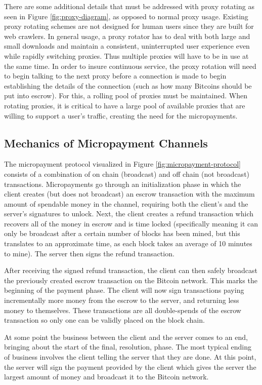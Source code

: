 There are some additional details that must be addressed with proxy rotating as seen in Figure \ref{fig:proxy-diagram}, as opposed to normal proxy usage. Existing proxy rotating schemes are not designed for human users since they are built for web crawlers. In general usage, a proxy rotator has to deal with both large and small downloads and maintain a consistent, uninterrupted user experience even while rapidly switching proxies. Thus multiple proxies will have to be in use at the same time. In order to insure continuous service, the proxy rotation will need to begin talking to the next proxy before a connection is made to begin establishing the details of the connection (such as how many Bitcoins should be put into escrow). For this, a rolling pool of proxies must be maintained. When rotating proxies, it is critical to have a large pool of available proxies that are willing to support a user's traffic, creating the need for the micropayments.

\subsection{Mechanics of Micropayment Channels}

The micropayment protocol visualized in Figure \ref{fig:micropayment-protocol} consists of a combination of on chain (broadcast) and off chain (not broadcast) transactions. Micropayments go through an initialization phase in which the client creates (but does not broadcast) an escrow transaction with the maximum amount of spendable money in the channel, requiring both the client's and the server's signatures to unlock. Next, the client creates a refund transaction which recovers all of the money in escrow and is time locked (specifically meaning it can only be broadcast after a certain number of blocks has been mined, but this translates to an approximate time, as each block takes an average of 10 minutes to mine). The server then signs the refund transaction.

After receiving the signed refund transaction, the client can then safely broadcast the previously created escrow transaction on the Bitcoin network. This marks the beginning of the payment phase. The client will now sign transactions paying incrementally more money from the escrow to the server, and returning less money to themselves. These transactions are all double-spends of the escrow transaction so only one can be validly placed on the block chain.

At some point the business between the client and the server comes to an end, bringing about the start of the final, resolution, phase. The most typical ending of business involves the client telling the server that they are done. At this point, the server will sign the payment provided by the client which gives the server the largest amount of money and broadcast it to the Bitcoin network.

